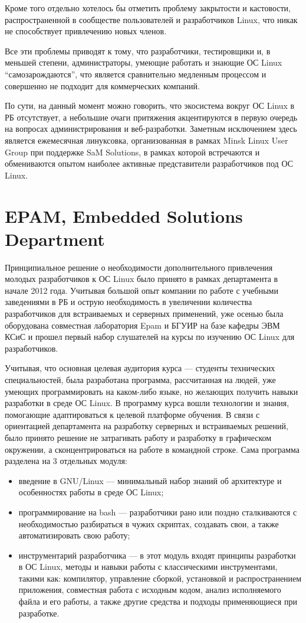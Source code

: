 \documentclass[10pt, a5paper]{article}
\begin{document}
Кроме того отдельно хотелось бы отметить проблему закрытости и кастовости, распространенной в сообществе пользователей и разработчиков Linux, что никак не способствует привлечению новых членов.

Все эти проблемы приводят к тому, что разработчики, тестировщики и, в меньшей степени, администраторы, умеющие работать и знающие ОС Linux “самозарождаются”, что  является сравнительно медленным процессом и совершенно не подходит для коммерческих компаний.

По сути, на данный момент можно говорить, что экосистема вокруг ОС Linux в РБ отсутствует, а небольшие очаги притяжения акцентируются в первую очередь на вопросах администрирования и веб-разработки. Заметным исключением здесь является ежемесячная линуксовка, организованная в рамках Minsk Linux User Group при поддержке SaM Solutions, в рамках которой встречаются и обмениваются опытом наиболее активные представители разработчиков под ОС Linux.

\section*{EPAM, Embedded Solutions Department}

Принципиальное решение о необходимости дополнительного привлечения молодых разработчиков к ОС Linux было принято в рамках департамента в начале 2012 года. Учитывая большой опыт компании по работе с учебными заведениями в РБ и острую необходимость в увеличении количества разработчиков для встраиваемых и серверных применений, уже осенью была оборудована совместная лаборатория Epam и БГУИР на базе кафедры ЭВМ КСиС и прошел первый набор слушателей на курсы по изучению ОС Linux для разработчиков.

Учитывая, что основная целевая аудитория курса --- студенты технических специальностей, была разработана программа, рассчитанная на людей, уже умеющих программировать на каком-либо языке, но желающих получить навыки разработки в среде ОС Linux. В программу курса вошли технологии и знания, помогающие адаптироваться к целевой платформе обучения.
В связи с ориентацией департамента на разработку серверных и встраиваемых решений, было принято решение не затрагивать работу и разработку в графическом окружении, а сконцентрироваться на работе в командной строке.
Сама программа разделена на 3 отдельных модуля:

\begin{itemize}
  \item введение в GNU/Linux --- минимальный набор знаний об архитектуре и особенностях работы в среде ОС Linux;
  \item программирование на bash --- разработчики рано или поздно сталкиваются с необходимостью разбираться в чужих скриптах, создавать свои, а также автоматизировать свою работу;
  \item инструментарий разработчика --- в этот модуль входят принципы разработки в ОС Linux, методы и навыки работы с классическими инструментами, такими как: компилятор, управление сборкой, установкой и распространением приложения, совместная работа с исходным кодом, анализ исполняемого файла и его работы, а также другие средства и подходы применяющиеся при разработке.
\end{itemize}
\end{document}
